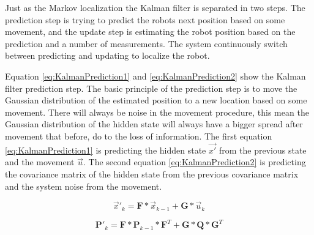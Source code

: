 
\pagebreak

Just as the Markov localization the Kalman filter is separated in two steps.
The prediction step is trying to predict the robots next position based on some movement, and the update step is estimating the robot position based on the prediction and a number of measurements.
The system continuously switch between predicting and updating to localize the robot.

Equation \ref{eq:KalmanPrediction1} and \ref{eq:KalmanPrediction2} show the Kalman filter prediction step.
The basic principle of the prediction step is to move the Gaussian distribution of the estimated position to a new location based on some movement.
There will always be noise in the movement procedure, this mean the Gaussian distribution of the hidden state will always have a bigger spread after movement that before, do to the loss of information.
The first equation \ref{eq:KalmanPrediction1} is predicting the hidden state \emph{$\vec{x'}$} from the previous state and the movement \emph{$\vec{u}$}.
The second equation \ref{eq:KalmanPrediction2} is predicting the covariance matrix of the hidden state from the previous covariance matrix and the system noise from the movement.

\begin{equation}
\label{eq:KalmanPrediction1}
\vec{x}'_{k} = \boldsymbol{F} * \vec{x}_{k-1} + \boldsymbol{G} * \vec{u}_{k}
\end{equation}

\begin{equation}
\label{eq:KalmanPrediction2}
\boldsymbol{P}'_{k} = \boldsymbol{F} * \boldsymbol{P}_{k-1} * \boldsymbol{F}^T + \boldsymbol{G} * \boldsymbol{Q} * \boldsymbol{G}^T
\end{equation}

